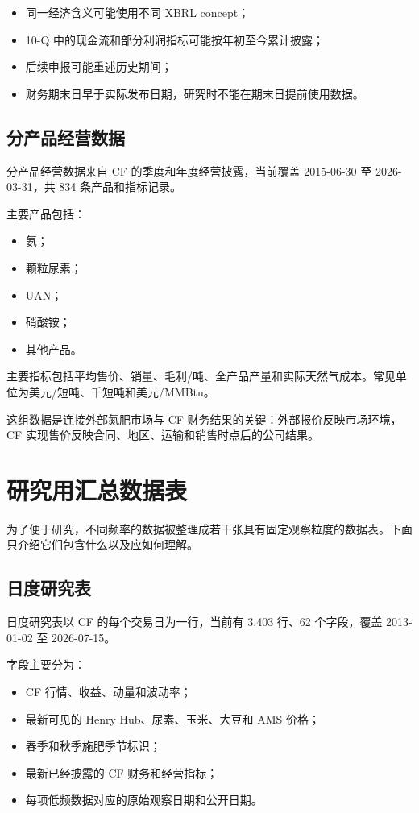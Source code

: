 \documentclass[11pt,a4paper]{ctexart}
\begin{document}
\begin{itemize}
  \item 同一经济含义可能使用不同 XBRL concept；
  \item 10-Q 中的现金流和部分利润指标可能按年初至今累计披露；
  \item 后续申报可能重述历史期间；
  \item 财务期末日早于实际发布日期，研究时不能在期末日提前使用数据。
\end{itemize}

\subsection{分产品经营数据}

分产品经营数据来自 CF 的季度和年度经营披露，当前覆盖 2015-06-30 至 2026-03-31，共 834 条产品和指标记录。

主要产品包括：

\begin{itemize}
  \item 氨；
  \item 颗粒尿素；
  \item UAN；
  \item 硝酸铵；
  \item 其他产品。
\end{itemize}

主要指标包括平均售价、销量、毛利/吨、全产品产量和实际天然气成本。常见单位为美元/短吨、千短吨和美元/MMBtu。

这组数据是连接外部氮肥市场与 CF 财务结果的关键：外部报价反映市场环境，CF 实现售价反映合同、地区、运输和销售时点后的公司结果。

\section{研究用汇总数据表}

为了便于研究，不同频率的数据被整理成若干张具有固定观察粒度的数据表。下面只介绍它们包含什么以及应如何理解。

\subsection{日度研究表}

日度研究表以 CF 的每个交易日为一行，当前有 3,403 行、62 个字段，覆盖 2013-01-02 至 2026-07-15。

字段主要分为：

\begin{itemize}
  \item CF 行情、收益、动量和波动率；
  \item 最新可见的 Henry Hub、尿素、玉米、大豆和 AMS 价格；
  \item 春季和秋季施肥季节标识；
  \item 最新已经披露的 CF 财务和经营指标；
  \item 每项低频数据对应的原始观察日期和公开日期。
\end{itemize}
\end{document}
